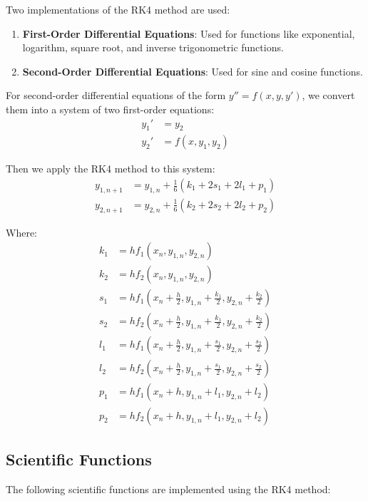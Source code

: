 \documentclass{article}
\begin{document}
Two implementations of the RK4 method are used:

\begin{enumerate}
    \item \textbf{First-Order Differential Equations}: Used for functions like exponential, logarithm, square root, and inverse trigonometric functions.
    \item \textbf{Second-Order Differential Equations}: Used for sine and cosine functions.
\end{enumerate}

For second-order differential equations of the form $y'' = f(x, y, y')$, we convert them into a system of two first-order equations:
\begin{align}
y_1' &= y_2\\
y_2' &= f(x, y_1, y_2)
\end{align}

Then we apply the RK4 method to this system:
\begin{align}
y_{1,n+1} &= y_{1,n} + \frac{1}{6}(k_1 + 2s_1 + 2l_1 + p_1)\\
y_{2,n+1} &= y_{2,n} + \frac{1}{6}(k_2 + 2s_2 + 2l_2 + p_2)
\end{align}

Where:
\begin{align}
k_1 &= hf_1(x_n, y_{1,n}, y_{2,n})\\
k_2 &= hf_2(x_n, y_{1,n}, y_{2,n})\\
s_1 &= hf_1\left(x_n + \frac{h}{2}, y_{1,n} + \frac{k_1}{2}, y_{2,n} + \frac{k_2}{2}\right)\\
s_2 &= hf_2\left(x_n + \frac{h}{2}, y_{1,n} + \frac{k_1}{2}, y_{2,n} + \frac{k_2}{2}\right)\\
l_1 &= hf_1\left(x_n + \frac{h}{2}, y_{1,n} + \frac{s_1}{2}, y_{2,n} + \frac{s_2}{2}\right)\\
l_2 &= hf_2\left(x_n + \frac{h}{2}, y_{1,n} + \frac{s_1}{2}, y_{2,n} + \frac{s_2}{2}\right)\\
p_1 &= hf_1(x_n + h, y_{1,n} + l_1, y_{2,n} + l_2)\\
p_2 &= hf_2(x_n + h, y_{1,n} + l_1, y_{2,n} + l_2)
\end{align}

\subsection{Scientific Functions}
The following scientific functions are implemented using the RK4 method:
\end{document}
